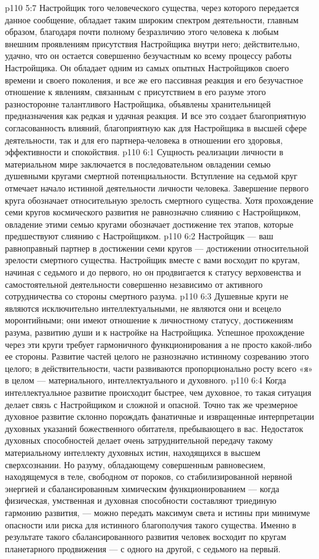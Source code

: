 \vs p110 5:7 \pc Настройщик того человеческого существа, через которого передается данное сообщение, обладает таким широким спектром деятельности, главным образом, благодаря почти полному безразличию этого человека к любым внешним проявлениям присутствия Настройщика внутри него; действительно, удачно, что он остается совершенно безучастным ко всему процессу работы Настройщика. Он обладает одним из самых опытных Настройщиков своего времени и своего поколения, и все же его пассивная реакция и его безучастное отношение к явлениям, связанным с присутствием в его разуме этого разносторонне талантливого Настройщика, объявлены хранительницей предназначения как редкая и удачная реакция. И все это создает благоприятную согласованность влияний, благоприятную как для Настройщика в высшей сфере деятельности, так и для его партнера\hyp{}человека в отношении его здоровья, эффективности и спокойствия.
\vs p110 6:1 Сущность реализации личности в материальном мире заключается в последовательном овладении семью душевными кругами смертной потенциальности. Вступление на седьмой круг отмечает начало истинной деятельности личности человека. Завершение первого круга обозначает относительную зрелость смертного существа. Хотя прохождение семи кругов космического развития не равнозначно слиянию с Настройщиком, овладение этими семью кругами обозначает достижение тех этапов, которые предшествуют слиянию с Настройщиком.
\vs p110 6:2 Настройщик --- ваш равноправный партнер в достижении семи кругов --- достижении относительной зрелости смертного существа. Настройщик вместе с вами восходит по кругам, начиная с седьмого и до первого, но он продвигается к статусу верховенства и самостоятельной деятельности совершенно независимо от активного сотрудничества со стороны смертного разума.
\vs p110 6:3 \pc Душевные круги не являются исключительно интеллектуальными, не являются они и всецело моронтийными; они имеют отношение к личностному статусу, достижениям разума, развитию души и к настройке на Настройщика. Успешное прохождение через эти круги требует гармоничного функционирования  а не просто какой\hyp{}либо ее стороны. Развитие частей целого не разнозначно истинному созреванию этого целого; в действительности, части развиваются пропорционально росту всего «я» в целом --- материального, интеллектуального и духовного.
\vs p110 6:4 Когда интеллектуальное развитие происходит быстрее, чем духовное, то такая ситуация делает связь с Настройщиком и сложной и опасной. Точно так же чрезмерное духовное развитие склонно порождать фанатичные и извращенные интерпретации духовных указаний божественного обитателя, пребывающего в вас. Недостаток духовных способностей делает очень затруднительной передачу такому материальному интеллекту духовных истин, находящихся в высшем сверхсознании. Но разуму, обладающему совершенным равновесием, находящемуся в теле, свободном от пороков, со стабилизированной нервной энергией и сбалансированным химическим функционированием --- когда физическая, умственная и духовная способности составляют триединую гармонию развития, --- можно передать максимум света и истины при минимуме опасности или риска для истинного благополучия такого существа. Именно в результате такого сбалансированного развития человек восходит по кругам планетарного продвижения --- с одного на другой, с седьмого на первый.
